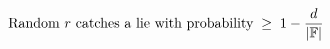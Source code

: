 \documentclass[preview]{standalone}
\begin{document}
\begin{align*}
\special{dvisvgm:raw <g id='unique000'>}\text{Random } r \text{ catches a lie with probability} \;\geq\; 1 - \frac{d}{|\mathbb{F}|}\special{dvisvgm:raw </g>}
\end{align*}
\end{document}
